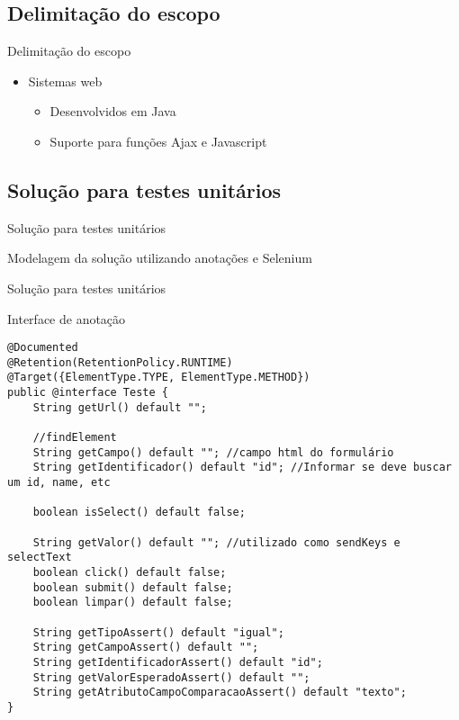 \documentclass{beamer}
\begin{document}
\subsection{Delimitação do escopo}
\begin{frame}{Delimitação do escopo}
	\begin{itemize}
		\item Sistemas web
		\begin{itemize}
			\item Desenvolvidos em Java
			\item Suporte para funções Ajax e Javascript
		\end{itemize}
	\end{itemize}
\end{frame}
\subsection{Solução para testes unitários}
\begin{frame}{Solução para testes unitários}
    \item Modelagem da solução utilizando anotações e Selenium
	\begin{center}\end{center}
\end{frame}
\begin{frame}[fragile]{Solução para testes unitários}
    \item Interface de anotação
    \begin{lstlisting}
@Documented
@Retention(RetentionPolicy.RUNTIME)
@Target({ElementType.TYPE, ElementType.METHOD})
public @interface Teste {
    String getUrl() default "";

    //findElement
    String getCampo() default ""; //campo html do formulário
    String getIdentificador() default "id"; //Informar se deve buscar um id, name, etc

    boolean isSelect() default false;

    String getValor() default ""; //utilizado como sendKeys e selectText
    boolean click() default false;
    boolean submit() default false;
    boolean limpar() default false;

    String getTipoAssert() default "igual";
    String getCampoAssert() default "";
    String getIdentificadorAssert() default "id";
    String getValorEsperadoAssert() default "";
    String getAtributoCampoComparacaoAssert() default "texto";
}
	\end{lstlisting}
\end{frame}
\end{document}
